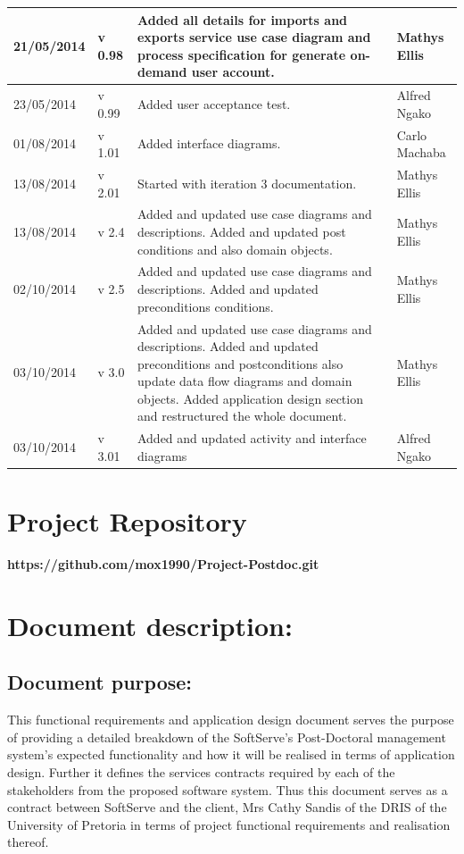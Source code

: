 \documentclass[12pt]{article}
\newcommand{\repo}{https://github.com/mox1990/Project-Postdoc.git}
\begin{document}
\begin{center}
\begin{longtable}{|l|p{1.4cm}|p{8cm}|p{2.8cm}|}
\hline
21/05/2014 & v 0.98 & Added all details for imports and exports service use case diagram and process specification for generate on-demand user account. & Mathys Ellis \\
\hline
23/05/2014 & v 0.99 & Added user acceptance test. & Alfred Ngako \\
\hline
01/08/2014 & v 1.01 & Added interface diagrams. & Carlo Machaba \\
\hline
13/08/2014 & v 2.01 & Started with iteration 3 documentation. & Mathys Ellis \\
\hline
13/08/2014 & v 2.4 & Added and updated use case diagrams and descriptions. Added and updated post conditions and also domain objects. & Mathys Ellis \\
\hline
02/10/2014 & v 2.5 & Added and updated use case diagrams and descriptions. Added and updated preconditions conditions. & Mathys Ellis \\
\hline
03/10/2014 & v 3.0 & Added and updated use case diagrams and descriptions. Added and updated preconditions and postconditions also update data flow diagrams and domain objects. Added application design section and restructured the whole document. & Mathys Ellis \\
\hline
03/10/2014 & v 3.01 & Added and updated activity and interface diagrams & Alfred Ngako \\
\hline

\end{longtable}
\end{center}
\newpage
\tableofcontents

\listoffigures
\newpage
\section{Project Repository}
\textbf{\repo}
\newpage
\section{Document description:}

\subsection{Document purpose:}
\vspace{0.2in}
This functional requirements and application design document serves the purpose of providing a detailed breakdown of the SoftServe's Post-Doctoral management system's expected functionality and how it will be realised in terms of application design. Further it defines the services contracts required by each of the stakeholders from the proposed software system. Thus this document serves as a contract between SoftServe and the client, Mrs Cathy Sandis of the DRIS of the University of Pretoria in terms of project functional requirements and realisation thereof.
\end{document}
